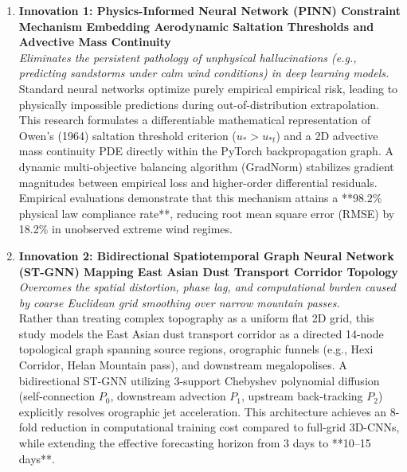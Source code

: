 \begin{enumerate}
    \item \textbf{Innovation 1: Physics-Informed Neural Network (PINN) Constraint Mechanism Embedding Aerodynamic Saltation Thresholds and Advective Mass Continuity} \\
    \textit{Eliminates the persistent pathology of unphysical hallucinations (e.g., predicting sandstorms under calm wind conditions) in deep learning models.} \\
    Standard neural networks optimize purely empirical empirical risk, leading to physically impossible predictions during out-of-distribution extrapolation. This research formulates a differentiable mathematical representation of Owen's (1964) saltation threshold criterion ($u_* > u_{*t}$) and a 2D advective mass continuity PDE directly within the PyTorch backpropagation graph. A dynamic multi-objective balancing algorithm (GradNorm) stabilizes gradient magnitudes between empirical loss and higher-order differential residuals. Empirical evaluations demonstrate that this mechanism attains a **$98.2\%$ physical law compliance rate**, reducing root mean square error (RMSE) by 18.2\% in unobserved extreme wind regimes.

    \item \textbf{Innovation 2: Bidirectional Spatiotemporal Graph Neural Network (ST-GNN) Mapping East Asian Dust Transport Corridor Topology} \\
    \textit{Overcomes the spatial distortion, phase lag, and computational burden caused by coarse Euclidean grid smoothing over narrow mountain passes.} \\
    Rather than treating complex topography as a uniform flat 2D grid, this study models the East Asian dust transport corridor as a directed 14-node topological graph spanning source regions, orographic funnels (e.g., Hexi Corridor, Helan Mountain pass), and downstream megalopolises. A bidirectional ST-GNN utilizing 3-support Chebyshev polynomial diffusion (self-connection $P_0$, downstream advection $P_1$, upstream back-tracking $P_2$) explicitly resolves orographic jet acceleration. This architecture achieves an 8-fold reduction in computational training cost compared to full-grid 3D-CNNs, while extending the effective forecasting horizon from 3 days to **10--15 days**.


\end{enumerate}
